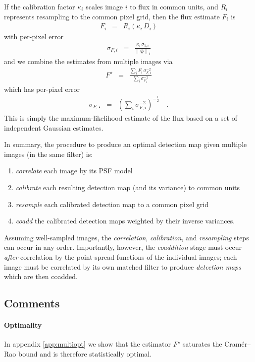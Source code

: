 \documentclass[letterpaper,preprint]{aastex62}
\newcommand{\psf}{\psi}
\newcommand{\psfnorm}{\norm{\bm{\psf}}}
\newcommand{\norm}[1]{\left\lVert #1 \right\rVert}
\begin{document}
If the calibration factor $\kappa_i$ scales image $i$ to flux in
common units, and $R_i$ represents resampling to the common pixel grid,
then the flux estimate $F_i$ is
\begin{eqnarray}
F_i &=& R_i(\kappa_i \, D_i)
\end{eqnarray}
with per-pixel error
\begin{eqnarray}
\sigma_{F, i} &=& \frac{\kappa_i \, \sigma_{1,i}}{\psfnorm_i}
\end{eqnarray}
and we combine the estimates from multiple images via
\begin{eqnarray}
F^{\star} &=& \frac{\displaystyle\sum_i F_i \, \sigma^{-2}_{F,i}}{\displaystyle\sum_i \sigma^{-2}_{F_i}}
\label{eq:onebandmap}
\end{eqnarray}
which has per-pixel error
\begin{eqnarray}
  \sigma_{F, \star} &=& \left( \sum_i \sigma^{-2}_{F,i} \right)^{-\frac{1}{2}}    \quad .
  \label{eq:onebandstd}
\end{eqnarray}
This is simply the maximum-likelihood estimate of the flux based on a
set of independent Gaussian estimates.


In summary, the procedure to produce an optimal detection map given
multiple images (in the same filter) is:
\begin{enumerate}
\item \emph{correlate} each image by its PSF model
\item \emph{calibrate} each resulting detection map (and its variance)
  to common units
\item \emph{resample} each calibrated detection map to a common pixel
  grid
\item \emph{coadd} the calibrated detection maps weighted by their
  inverse variances.
\end{enumerate}
Assuming well-sampled images, the \emph{correlation},
\emph{calibration}, and \emph{resampling} steps can occur in any
order.  Importantly, however, the \emph{coaddition} stage must occur
\emph{after} correlation by the point-spread functions of the
individual images; each image must be correlated by its own matched
filter to produce \emph{detection maps} which are then coadded.

\subsection{Comments}

\paragraph{Optimality}
In appendix \ref{app:multiopt} we show that the estimator $F^{\star}$
saturates the Cram\'er--Rao bound and is therefore statistically
optimal.
\end{document}
